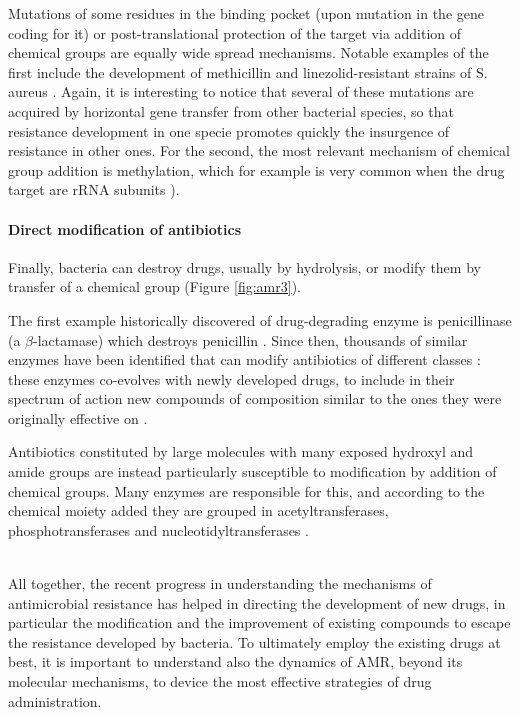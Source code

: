 Mutations of some residues in the binding pocket (upon mutation in the gene coding for it) or post-translational protection of the target via addition of chemical groups are equally wide spread mechanisms.
%
Notable examples of the first include the development of methicillin and linezolid-resistant strains of S. aureus \cite{Shore2011,Billal2011}. Again, it is interesting to notice that several of these mutations are acquired by horizontal gene transfer from other bacterial species, so that resistance development in one specie promotes quickly the insurgence of resistance in other ones.
%
For the second, the most relevant mechanism of chemical group addition is methylation, which for example is very common when the drug target are rRNA subunits \cite{Long2006}).


\paragraph{Direct modification of antibiotics}
Finally, bacteria can destroy drugs, usually by hydrolysis, or modify them by transfer of a chemical group (Figure \ref{fig:amr3}).

The first example historically discovered of drug-degrading enzyme is penicillinase (a $\beta$-lactamase) which destroys penicillin \cite{Abraham1988}. Since then, thousands of similar enzymes have been identified that can modify antibiotics of different classes \cite{Livermore2008,Nordmann2011}:
%
these enzymes co-evolves with newly developed drugs, to include in their spectrum of action new compounds of composition similar to the ones they were originally effective on \cite{Woodford2013}.

Antibiotics constituted by large molecules with many exposed hydroxyl and amide groups are instead particularly susceptible to modification by addition of chemical groups. Many enzymes are responsible for this, and according to the chemical moiety added they are grouped in acetyltransferases, phosphotransferases and nucleotidyltransferases \cite{Wright2005}.

\hspace{0.5cm}
\\
All together, the recent progress in understanding the mechanisms of antimicrobial resistance has helped in directing the development of new drugs, in particular the modification and the improvement of existing compounds to escape the resistance developed by bacteria. To ultimately employ the existing drugs at best, it is important to understand also the dynamics of AMR, beyond its molecular mechanisms, to device the most effective strategies of drug administration.


